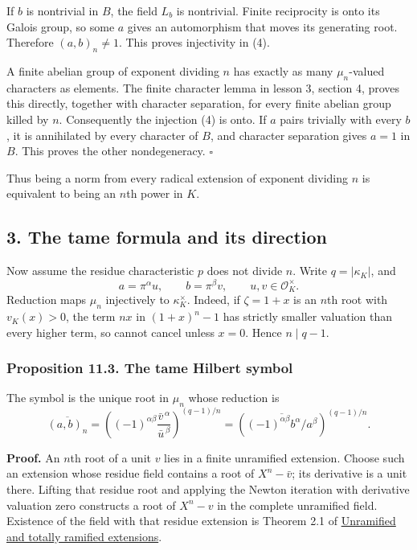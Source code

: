 \documentclass[11pt,a4paper]{article}
\begin{document}
If \(b\) is nontrivial in \(B\), the field \(L_b\) is nontrivial. Finite
reciprocity is onto its Galois group, so some \(a\) gives an
automorphism that moves its generating root. Therefore \((a,b)_n\ne1\).
This proves injectivity in (4).

A finite abelian group of exponent dividing \(n\) has exactly as many
\(\mu_n\)-valued characters as elements. The finite character lemma in
lesson 3, section 4, proves this directly, together with character
separation, for every finite abelian group killed by \(n\). Consequently
the injection (4) is onto. If \(a\) pairs trivially with every \(b\), it
is annihilated by every character of \(B\), and character separation
gives \(a=1\) in \(B\). This proves the other nondegeneracy. \(\square\)

Thus being a norm from every radical extension of exponent dividing
\(n\) is equivalent to being an \(n\)th power in \(K\).

\subsection{3. The tame formula and its
direction}\label{the-tame-formula-and-its-direction}

Now assume the residue characteristic \(p\) does not divide \(n\). Write
\(q=|\kappa_K|\), and \[
a=\pi^\alpha u,\qquad b=\pi^\beta v,\qquad u,v\in\mathcal O_K^\times.
\] Reduction maps \(\mu_n\) injectively to \(\kappa_K^\times\). Indeed,
if \(\zeta=1+x\) is an \(n\)th root with \(v_K(x)>0\), the term \(nx\)
in \((1+x)^n-1\) has strictly smaller valuation than every higher term,
so cannot cancel unless \(x=0\). Hence \(n\mid q-1\).

\subsubsection{Proposition 11.3. The tame Hilbert
symbol}\label{proposition-11.3.-the-tame-hilbert-symbol}

The symbol is the unique root in \(\mu_n\) whose reduction is \[
\overline{(a,b)_n}
 =\left((-1)^{\alpha\beta}
          \frac{\bar v^{\,\alpha}}{\bar u^{\,\beta}}\right)^{(q-1)/n}
 =\left(\overline{(-1)^{\alpha\beta}b^\alpha/a^\beta}\right)^{(q-1)/n}.
\tag{5}
\]

\textbf{Proof.} An \(n\)th root of a unit \(v\) lies in a finite
unramified extension. Choose such an extension whose residue field
contains a root of \(X^n-\bar v\); its derivative is a unit there.
Lifting that residue root and applying the Newton iteration with
derivative valuation zero constructs a root of \(X^n-v\) in the complete
unramified field. Existence of the field with that residue extension is
Theorem 2.1 of
\href{https://kokunoyumeto.github.io/open-math-courses/courses/NT-CFT/proof-dependencies.html\#NT-LOC-07}{Unramified
and totally ramified extensions}.
\end{document}
